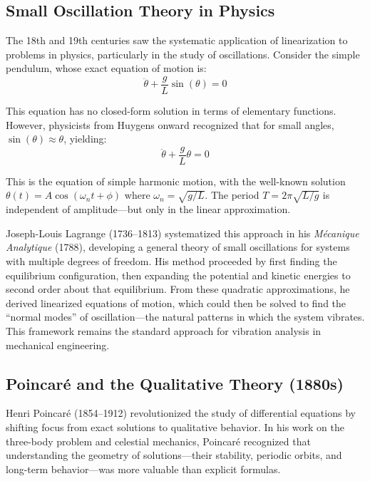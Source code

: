 \subsection{Small Oscillation Theory in Physics}

The 18th and 19th centuries saw the systematic application of linearization to problems in physics, particularly in the study of oscillations. Consider the simple pendulum, whose exact equation of motion is:
\begin{equation}
\ddot{\theta} + \frac{g}{L}\sin(\theta) = 0
\end{equation}

This equation has no closed-form solution in terms of elementary functions. However, physicists from Huygens onward recognized that for small angles, $\sin(\theta) \approx \theta$, yielding:
\begin{equation}
\ddot{\theta} + \frac{g}{L}\theta = 0
\end{equation}

This is the equation of simple harmonic motion, with the well-known solution $\theta(t) = A\cos(\omega_n t + \phi)$ where $\omega_n = \sqrt{g/L}$. The period $T = 2\pi\sqrt{L/g}$ is independent of amplitude---but only in the linear approximation.

Joseph-Louis Lagrange (1736--1813) systematized this approach in his \textit{M\'{e}canique Analytique} (1788), developing a general theory of small oscillations for systems with multiple degrees of freedom. His method proceeded by first finding the equilibrium configuration, then expanding the potential and kinetic energies to second order about that equilibrium. From these quadratic approximations, he derived linearized equations of motion, which could then be solved to find the ``normal modes'' of oscillation---the natural patterns in which the system vibrates. This framework remains the standard approach for vibration analysis in mechanical engineering.

\subsection{Poincar\'{e} and the Qualitative Theory (1880s)}

Henri Poincar\'{e} (1854--1912) revolutionized the study of differential equations by shifting focus from exact solutions to qualitative behavior. In his work on the three-body problem and celestial mechanics, Poincar\'{e} recognized that understanding the geometry of solutions---their stability, periodic orbits, and long-term behavior---was more valuable than explicit formulas.

